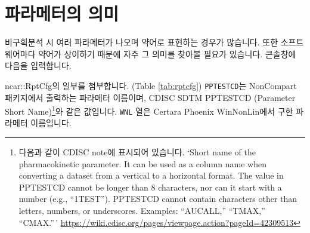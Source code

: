 \documentclass[
  11pt,
  krantz2, a4paper, twoside]{krantz}
\begin{document}
\hypertarget{parameters}{%
\section{파라메터의 의미}\label{parameters}}

비구획분석 시 여러 파라메터가 나오며 약어로 표현하는 경우가 많습니다. 또한 소프트웨어마다 약어가 상이하기 때문에 자주 그 의미를 찾아볼 필요가 있습니다. 콘솔창에 다음을 입력합니다.

ncar::RptCfg의 일부를 첨부합니다. (Table \ref{tab:rptcfg}) \texttt{PPTESTCD}는 NonCompart 패키지에서 출력하는 파라메터 이름이며, CDISC SDTM PPTESTCD (Parameter Short Name)\footnote{다음과 같이 CDISC note에 표시되어 있습니다. `Short name of the pharmacokinetic parameter. It can be used as a column name when converting a dataset from a vertical to a horizontal format. The value in PPTESTCD cannot be longer than 8 characters, nor can it start with a number (e.g., ``1TEST''). PPTESTCD cannot contain characters other than letters, numbers, or underscores. Examples: ``AUCALL,'' ``TMAX,'' ``CMAX.''\,' \url{https://wiki.cdisc.org/pages/viewpage.action?pageId=42309513}}와 같은 값입니다. \texttt{WNL} 열은 Certara Phoenix WinNonLin에서 구한 파라메터 이름입니다.
\end{document}

